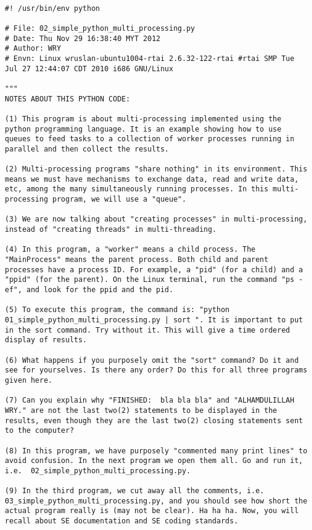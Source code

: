 \begin{lstlisting}[caption={App4-Python Parallel Multiprocessing Codes}, label=App4-Python Parallel Multiprocessing Codes]

#! /usr/bin/env python

# File: 02_simple_python_multi_processing.py
# Date: Thu Nov 29 16:38:40 MYT 2012
# Author: WRY
# Envn: Linux wruslan-ubuntu1004-rtai 2.6.32-122-rtai #rtai SMP Tue Jul 27 12:44:07 CDT 2010 i686 GNU/Linux

"""
NOTES ABOUT THIS PYTHON CODE: 

(1) This program is about multi-processing implemented using the python programming language. It is an example showing how to use queues to feed tasks to a collection of worker processes running in parallel and then collect the results.

(2) Multi-processing programs "share nothing" in its environment. This means we must have mechanisms to exchange data, read and write data, etc, among the many simultaneously running processes. In this multi-processing program, we will use a "queue".

(3) We are now talking about "creating processes" in multi-processing, instead of "creating threads" in multi-threading.

(4) In this program, a "worker" means a child process. The "MainProcess" means the parent process. Both child and parent processes have a process ID. For example, a "pid" (for a child) and a "ppid" (for the parent). On the Linux terminal, run the command "ps -ef", and look for the ppid and the pid.

(5) To execute this program, the command is: "python 01_simple_python_multi_processing.py | sort ". It is important to put in the sort command. Try without it. This will give a time ordered display of results.

(6) What happens if you purposely omit the "sort" command? Do it and see for yourselves. Is there any order? Do this for all three programs given here.

(7) Can you explain why "FINISHED:  bla bla bla" and "ALHAMDULILLAH WRY." are not the last two(2) statements to be displayed in the results, even though they are the last two(2) closing statements sent to the computer?

(8) In this program, we have purposely "commented many print lines" to avoid confusion. In the next program we open them all. Go and run it, i.e.  02_simple_python_multi_processing.py.

(9) In the third program, we cut away all the comments, i.e. 03_simple_python_multi_processing.py, and you should see how short the actual program really is (may not be clear). Ha ha ha. Now, you will recall about SE documentation and SE coding standards. 


\end{lstlisting}
